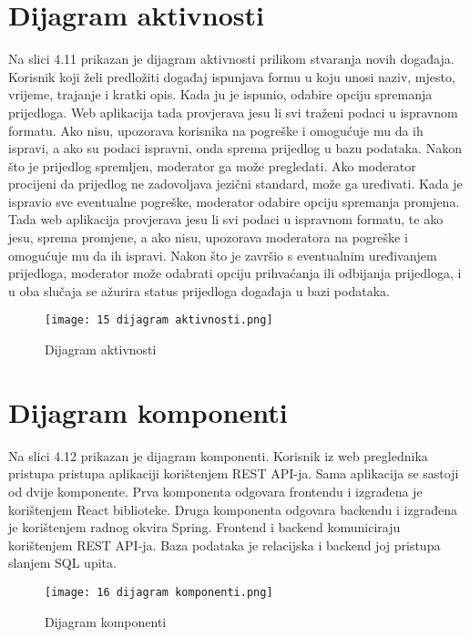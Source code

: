 			
			\eject 
		
		\section{Dijagram aktivnosti}
		
		Na slici 4.11 prikazan je dijagram aktivnosti prilikom stvaranja novih događaja. Korisnik koji želi predložiti događaj ispunjava formu u koju unosi naziv, mjesto, vrijeme, trajanje i kratki opis. Kada ju je ispunio, odabire opciju spremanja prijedloga. Web aplikacija tada provjerava jesu li svi traženi podaci u ispravnom formatu. Ako nisu, upozorava korisnika na pogreške i omogućuje mu da ih ispravi, a ako su podaci ispravni, onda sprema prijedlog u bazu podataka. Nakon što je prijedlog spremljen, moderator ga može pregledati. Ako moderator procijeni da prijedlog ne zadovoljava jezični standard, može ga uređivati. Kada je ispravio sve eventualne pogreške, moderator odabire opciju spremanja promjena. Tada web aplikacija provjerava jesu li svi podaci u ispravnom formatu, te ako jesu, sprema promjene, a ako nisu, upozorava moderatora na pogreške i omogućuje mu da ih ispravi. Nakon što je završio s eventualnim uređivanjem prijedloga, moderator može odabrati opciju prihvaćanja ili odbijanja prijedloga, i u oba slučaja se ažurira status prijedloga događaja u bazi podataka.
			
			\begin{figure}[H]
					\centering
					\texttt{[image: 15 dijagram aktivnosti.png]}
					\caption{Dijagram aktivnosti}
				\end{figure}	
			
			\eject
		\section{Dijagram komponenti}
		
		 Na slici 4.12 prikazan je dijagram komponenti. Korisnik iz web preglednika pristupa pristupa aplikaciji korištenjem REST API-ja. Sama aplikacija se sastoji od dvije komponente. Prva komponenta odgovara frontendu i izgrađena je korištenjem React biblioteke. Druga komponenta odgovara backendu i izgrađena je korištenjem radnog okvira Spring. Frontend i backend komuniciraju korištenjem REST API-ja. Baza podataka je relacijska i backend joj pristupa slanjem SQL upita.
		
			\begin{figure}[H]
					\centering
					\texttt{[image: 16 dijagram komponenti.png]}
					\caption{Dijagram komponenti}
				\end{figure}	
				\newpage			
